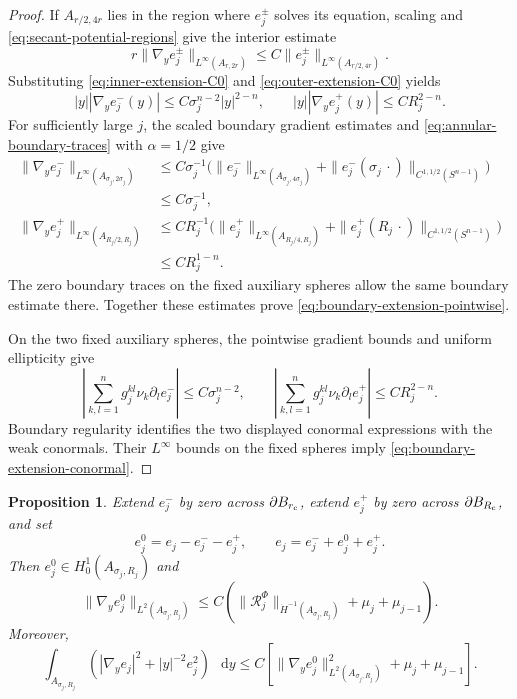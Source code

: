 \documentclass[11pt]{article}
\numberwithin{equation}{section}
\newtheorem{proposition}[theorem]{Proposition}
\theoremstyle{remark}
\newcommand{\Sph}{S}
\newcommand{\norm}[1]{\lVert #1\rVert}
\newcommand{\dd}{\mathop{}\!\mathrm{d}}
\begin{document}
\begin{proof}
If \(A_{r/2,4r}\) lies in the region where \(e_j^\pm\) solves its
equation, scaling and \eqref{eq:secant-potential-regions} give the
interior estimate
\[
 r\|\nabla_ye_j^\pm\|_{L^\infty(A_{r,2r})}
 \le C\|e_j^\pm\|_{L^\infty(A_{r/2,4r})}.
\]
Substituting \eqref{eq:inner-extension-C0} and
\eqref{eq:outer-extension-C0} yields
\[
 |y||\nabla_ye_j^-(y)|
 \le C\sigma_j^{n-2}|y|^{2-n},
 \qquad
 |y||\nabla_ye_j^+(y)|
 \le CR_j^{2-n}.
\]
For sufficiently large \(j\), the scaled boundary gradient estimates and
\eqref{eq:annular-boundary-traces} with \(\alpha=1/2\) give
\[
 \begin{aligned}
 \|\nabla_ye_j^-\|_{L^\infty(A_{\sigma_j,2\sigma_j})}
 &\le C\sigma_j^{-1}\bigl(
 \|e_j^-\|_{L^\infty(A_{\sigma_j,4\sigma_j})}
 +\|e_j^-(\sigma_j\,\cdot)\|_{C^{1,1/2}(\Sph^{n-1})}\bigr)\\
 &\le C\sigma_j^{-1},\\
 \|\nabla_ye_j^+\|_{L^\infty(A_{R_j/2,R_j})}
 &\le CR_j^{-1}\bigl(
 \|e_j^+\|_{L^\infty(A_{R_j/4,R_j})}
 +\|e_j^+(R_j\,\cdot)\|_{C^{1,1/2}(\Sph^{n-1})}\bigr)\\
 &\le CR_j^{1-n}.
 \end{aligned}
\]
The zero boundary traces on the fixed auxiliary spheres allow the same
boundary estimate there. Together these estimates prove
\eqref{eq:boundary-extension-pointwise}.

On the two fixed auxiliary spheres, the pointwise gradient bounds and
uniform ellipticity give
\[
 \left|\sum_{k,l=1}^ng_j^{kl}\nu_k\partial_le_j^-\right|
 \le C\sigma_j^{n-2},\qquad
 \left|\sum_{k,l=1}^ng_j^{kl}\nu_k\partial_le_j^+\right|
 \le CR_j^{2-n}.
\]
Boundary regularity identifies the two displayed conormal expressions with
the weak conormals. Their \(L^\infty\) bounds on the fixed spheres imply
\eqref{eq:boundary-extension-conormal}.
\end{proof}

\par
\begin{proposition}\label{prop:zero-boundary-remainder}
Extend \(e_j^-\) by zero across \(\partial B_{r_{\rm c}}\), extend
\(e_j^+\) by zero across \(\partial B_{R_{\rm c}}\), and set
\begin{equation}\label{eq:zero-boundary-remainder}
 e_j^0=e_j-e_j^--e_j^+,\qquad
 e_j=e_j^-+e_j^0+e_j^+.
\end{equation}
Then \(e_j^0\in H_0^1(A_{\sigma_j,R_j})\) and
\begin{equation}\label{eq:zero-boundary-final-size}
 \|\nabla_ye_j^0\|_{L^2(A_{\sigma_j,R_j})}
 \le C\left(
 \|\mathcal R_j^\Phi\|_{\dot H^{-1}(A_{\sigma_j,R_j})}
 +\mu_j+\mu_{j-1}\right).
\end{equation}
Moreover,
\begin{equation}\label{eq:total-error-energy}
 \int_{A_{\sigma_j,R_j}}
 \left(|\nabla_ye_j|^2+|y|^{-2}e_j^2\right)\,\dd y
 \le C\left[
 \norm{\nabla_ye_j^0}_{L^2(A_{\sigma_j,R_j})}^2
 +\mu_j+\mu_{j-1}\right].
\end{equation}
\end{proposition}
\end{document}
